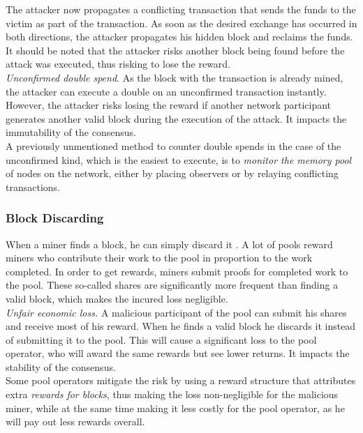 \documentclass[12pt,a4paper]{article}
\begin{document}
The attacker now propagates a conflicting \gls{transaction} that sends the funds to the victim as part of the \gls{transaction}. As soon as the desired exchange has occurred in both directions, the attacker propagates his hidden block and reclaims the funds. It should be noted that the attacker risks another block being found before the attack was executed, thus risking to lose the \gls{reward}.\\

\textit{Unconfirmed double spend}. As the block with the \gls{transaction} is already mined, the attacker can execute a \gls{double} on an unconfirmed \gls{transaction} instantly. However, the attacker risks losing the \gls{reward} if another network participant generates another valid block during the execution of the attack. It impacts the immutability of the \gls{consensus}.\\

A previously unmentioned method to counter double spends in the case of the unconfirmed kind, which is the easiest to execute, is to \textit{monitor the memory pool} of nodes on the network, either by placing observers or by relaying conflicting transactions.\\

\subsubsection{Block Discarding}

When a miner finds a block, he can simply discard it \cite{less}. A lot of \glspl{pool} reward \glspl{miner} who contribute their work to the \gls{pool} in proportion to the work completed. In order to get rewards, \glspl{miner} submit proofs for completed work to the \gls{pool}. These so-called shares are significantly more frequent than finding a valid \gls{block}, which makes the incured loss negligible.\\

\textit{Unfair economic loss.} A malicious participant of the \gls{pool} can submit his shares and receive most of his \gls{reward}. When he finds a valid \gls{block} he discards it instead of submitting it to the \gls{pool}. This will cause a significant loss to the pool operator, who will award the same rewards but see lower returns. It impacts the stability of the \gls{consensus}.\\

Some pool operators mitigate the risk by using a reward structure that attributes extra \textit{rewards for blocks}, thus making the loss non-negligible for the malicious miner, while at the same time making it less costly for the \gls{pool} operator, as he will pay out less rewards overall.\\
\end{document}
